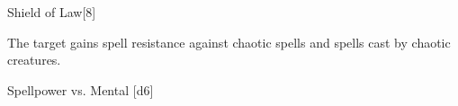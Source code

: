 \begin{spellsection}{Shield of Law}[8]
    \begin{spellheader}
    \end{spellheader}
    \begin{spellcontent}
        \begin{spelltargetinginfo}
        \end{spelltargetinginfo}
        \begin{spelleffects}
            \spelleffect The target gains spell resistance against chaotic spells and spells cast by chaotic creatures.
            \spelldur \durshort \dismissable
        \end{spelleffects}
    \end{spellcontent}
    \begin{spellsubcontent}
        \begin{spelltargetinginfo}
        \end{spelltargetinginfo}
        \begin{spelleffects}
            \begin{spellattack}{Spellpower vs. Mental}
                \spellsuccess {}[d6]
            \end{spellattack}
        \end{spelleffects}
    \end{spellsubcontent}
    \begin{spellfooter}
        \miscastexplode
    \end{spellfooter}
\end{spellsection}

